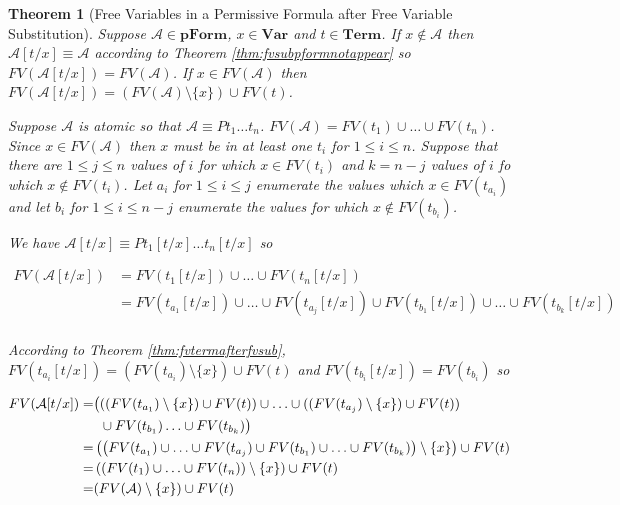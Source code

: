 \documentclass[12pt]{article}
\theoremstyle{break}
\theoremstyle{break}
\newtheorem{theorem}{Theorem}[section]
\theoremstyle{break}
\theoremstyle{break}
\theoremstyle{break}
\newtheorem{informal definition}[definition]{Informal Definition}
\newcommand{\mc}[1]{\mathcal{#1}}
\begin{document}
\begin{theorem}[Free Variables in a Permissive Formula after Free Variable Substitution]
\label{thm:fvinpformafterfvsub}
Suppose $\mc{A} \in \textbf{pForm}$, $x \in \textbf{Var}$ and $t\in\textbf{Term}$. If $x\not \in \mc{A}$ then $\mc{A}[t/x]\equiv \mc{A}$ according to Theorem \ref{thm:fvsubpformnotappear} so $FV(\mc{A}[t/x]) =  FV(\mc{A})$. If $x\in FV(\mc{A})$ then $FV(\mc{A}[t/x]) = (FV(\mc{A})\setminus \{x\})\cup FV(t)$.

Suppose $\mc{A}$ is atomic so that $\mc{A} \equiv Pt_1\ldots t_n$. $FV(\mc{A}) = FV(t_1)\cup\ldots \cup FV(t_n)$. Since $x\in FV(\mc{A})$ then $x$ must be in at least one $t_i$ for $1 \le i \le n$. Suppose that there are $1\le j \le n$ values of $i$ for which $x\in FV(t_i)$ and $k=n-j$ values of $i$ fo which $x\not \in FV(t_i)$. Let $a_i$ for $1\le i \le j$ enumerate the values which $x\in FV(t_{a_i})$ and let $b_i$ for $1 \le i \le n-j$ enumerate the values for which $x\not \in FV(t_{b_i})$.

We have $\mc{A}[t/x] \equiv Pt_1[t/x]\ldots t_n[t/x]$ so

\begin{align}
FV(\mc{A}[t/x]) &= FV(t_1[t/x])\cup\ldots \cup FV(t_n[t/x]) \nonumber\\
&= FV(t_{a_1}[t/x])\cup\ldots\cup FV(t_{a_j}[t/x]) \cup FV(t_{b_1}[t/x]) \cup \ldots \cup FV(t_{b_k}[t/x]) \nonumber\\
\end{align}

According to Theorem \ref{thm:fvtermafterfvsub}, $FV(t_{a_i}[t/x]) = (FV(t_{a_i})\setminus\{x\})\cup FV(t)$ and $FV(t_{b_i}[t/x]) = FV(t_{b_i})$ so

\begin{align}
FV(\mc{A}[t/x]) =& \begin{aligned}[t]\big( &((FV(t_{a_1})\setminus\{x\})\cup FV(t)) \cup \ldots \cup ((FV(t_{a_j})\setminus\{x\})\cup FV(t)) \\
& \cup FV(t_{b_1}) \ldots \cup FV(t_{b_k}) \big)\end{aligned} \notag \\
=& \left(\left(FV(t_{a_1})\cup \ldots \cup FV(t_{a_j}) \cup FV(t_{b_1}) \cup \ldots \cup FV(t_{b_k})\right)\setminus \{x\} \right) \cup FV(t) \notag\\
=& \left(\left(FV(t_1)\cup \ldots \cup FV(t_n)\right)\setminus\{x\}\right)\cup FV(t) \notag\\
=& (FV(\mc{A})\setminus\{x\})\cup FV(t) \notag
\end{align}

\end{theorem}
\end{document}
